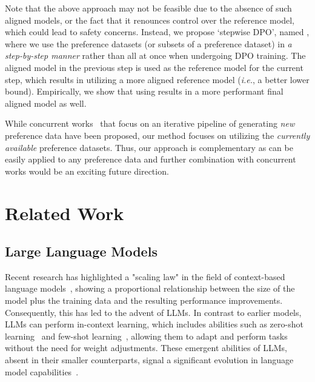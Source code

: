 Note that the above approach may not be feasible due to the absence of such aligned models, or the fact that it renounces control over the reference model, which could lead to safety concerns.
Instead, we propose `stepwise DPO', named \method, where we use the preference datasets (or subsets of a preference dataset) in {\it a step-by-step manner} rather than all at once when undergoing DPO training.
The aligned model in the previous step is used as the reference model for the current step, which results in utilizing a more aligned reference model ({\it i.e.}, a better lower bound).
Empirically, we show that using \method results in a more performant final aligned model as well.

While concurrent works~\citep{yuan2024self} that focus on an iterative pipeline of generating \textit{new} preference data have been proposed, 
our method focuses on utilizing the \textit{currently available} preference datasets.
Thus, our approach is complementary as \method can be easily applied to any preference data and further combination with concurrent works would be an exciting future direction.

\section{Related Work}

\subsection{Large Language Models}
Recent research has highlighted a "scaling law" in the field of context-based language models~\cite{kaplan2020scaling, hernandez2021scaling, anil2023palm}, showing a proportional relationship between the size of the model plus the training data and the resulting performance improvements. Consequently, this has led to the advent of LLMs. In contrast to earlier models, LLMs can perform in-context learning, which includes abilities such as zero-shot learning~\cite{radford2019language} and few-shot learning~\cite{brown2020language}, allowing them to adapt and perform tasks without the need for weight adjustments. These emergent abilities of LLMs, absent in their smaller counterparts, signal a significant evolution in language model capabilities~\cite{wei2022emergent}.


